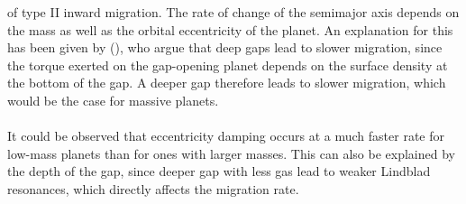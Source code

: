   of type II inward migration. The rate of change of the semimajor axis 
  depends on the mass as well as the orbital eccentricity of the planet. 
  An explanation for this has been given by
  \citeauthor{Kanagawa_2018} (\citeyear{Kanagawa_2018}), who argue that deep 
  gaps lead to slower migration, since the torque exerted on the gap-opening 
  planet depends on the surface density at the bottom of the gap. A deeper 
  gap therefore leads to slower migration, which would be the case for 
  massive planets. \\
  \\
  It could be observed that eccentricity damping occurs at a much faster 
  rate for low-mass planets than 
  for ones with larger masses. This can also be explained by the depth of 
  the gap, since deeper gap with less gas lead to weaker Lindblad resonances,
  which directly affects the migration rate. 

